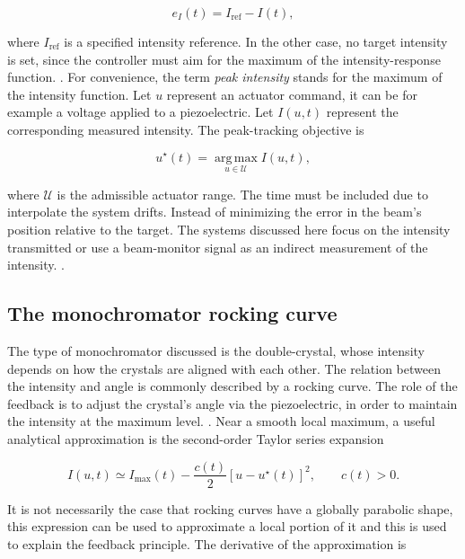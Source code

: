 \begin{equation}
    e_I(t)=I_{\mathrm{ref}}-I(t),
    \label{eq:intensity_setpoint_error}
\end{equation}

where $I_{\mathrm{ref}}$ is a specified intensity reference.
In the other case, no target intensity is set, since the controller must aim for the maximum of the intensity-response function.
\cite{MoCo2008,Quinn2021}.
For convenience, the term \emph{peak intensity} stands for the maximum of the intensity function.
Let $u$ represent an actuator command, it can be for example a voltage applied to a piezoelectric.
Let $I(u,t)$ represent the corresponding measured intensity. The peak-tracking objective is

\begin{equation}
    u^\star(t)
    =
    \operatorname*{arg\,max}_{u\in\mathcal{U}} I(u,t),
    \label{eq:peak_tracking_objective}
\end{equation}

where $\mathcal{U}$ is the admissible actuator range.
The time must be included due to interpolate the system drifts.
Instead of minimizing the error in the beam's position relative to the target.
The systems discussed here focus on the intensity transmitted or use a beam-monitor signal as an indirect measurement of the intensity.
\cite{Proux2006,Zohar2016,Quinn2021}.

\subsection{The monochromator rocking curve}

The type of monochromator discussed is the double-crystal, whose intensity depends on how the crystals are aligned with each other.
The relation between the intensity and angle is commonly described by a rocking curve.
The role of the feedback is to adjust the crystal's angle via the piezoelectric, in order to maintain the intensity at the maximum level.
\cite{Proux2006}.
Near a smooth local maximum, a useful analytical approximation is the second-order Taylor series expansion

\begin{equation}
    I(u,t)
    \simeq
    I_{\max}(t)
    -
    \frac{c(t)}{2}
    \left[u-u^\star(t)\right]^2,
    \qquad c(t)>0.
    \label{eq:local_peak_model}
\end{equation}

It is not necessarily the case that rocking curves have a globally parabolic shape, this expression can be used to approximate a local portion of it and this is used to explain the feedback principle.
The derivative of the approximation is

